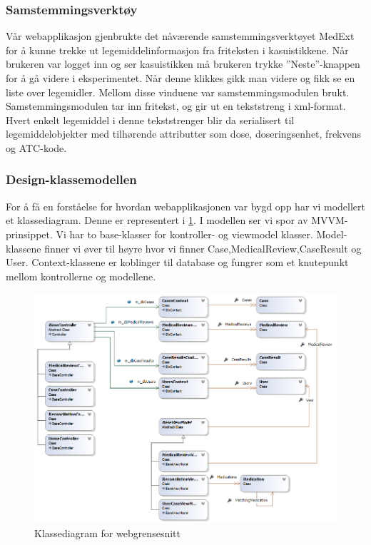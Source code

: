 \subsubsection{Samstemmingsverktøy}
Vår webapplikasjon gjenbrukte det nåværende samstemmingsverktøyet MedExt for å kunne trekke ut legemiddelinformasjon fra friteksten i kasuistikkene. Når brukeren var logget inn og ser kasuistikken må brukeren trykke ''Neste''-knappen for å gå videre i eksperimentet. Når denne klikkes gikk man videre og fikk se en liste over legemidler. Mellom disse vinduene var samstemmingsmodulen brukt. Samstemmingsmodulen tar inn fritekst, og gir ut en tekststreng i xml-format. Hvert enkelt legemiddel i denne tekststrenger blir da serialisert til legemiddelobjekter med tilhørende attributter som dose, doseringsenhet, frekvens og ATC-kode. 

\subsubsection{Design-klassemodellen}
For å få en forståelse for hvordan webapplikasjonen var bygd opp har vi modellert et klassediagram. Denne er representert i \ref{fig:classDiagram}. I modellen ser vi spor av MVVM-prinsippet. Vi har to base-klasser for kontroller- og viewmodel klasser. Model-klassene finner vi øver til høyre hvor vi finner Case,MedicalReview,CaseResult og User. Context-klassene er koblinger til database og fungrer som et knutepunkt mellom kontrollerne og modellene.
\begin{figure}[H]
\centering
\includegraphics[width=14cm]{images/ClassDiagram.png}
\caption{Klassediagram for webgrensesnitt}
\label{fig:classDiagram}
\end{figure}

